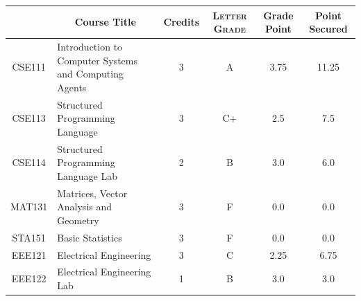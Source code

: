 \documentclass[11pt]{article}
\newcommand*{\numtwo}[1]{\pgfmathprintnumber[
                    fixed, precision=2, fixed zerofill=true]{#1}}
\begin{document}
                \begin{center}
                    \renewcommand{\arraystretch}{1.08}
                    
                \begin{tabular}{|c|l|c|>{\scshape}c|c|c|}
                \hline  \rule[-1ex]{0pt}{3.5ex} {\centering{\bf Course Code}} &  \multicolumn{1}{c|}{\textbf{Course Title}}  & {\bf Credits} & {\bf Letter Grade} & {\bf Grade Point} & {\bf Point Secured}  \\ 
                \hline   CSE111 &  Introduction to Computer Systems and Computing Agents		 & 3 & A & 3.75 & 11.25 \\ %
                \hline   CSE113 &  Structured Programming Language		 & 3 & C+ & 2.5 & 7.5 \\ %
                \hline   CSE114 &  Structured Programming Language Lab		 & 2 & B & 3.0 & 6.0 \\ %
                \hline   MAT131 &  Matrices, Vector Analysis and Geometry		 & 3 & F & 0.0 & 0.0 \\ %
                \hline   STA151 &  Basic Statistics		 & 3 & F & 0.0 & 0.0 \\ %
                \hline   EEE121 &  Electrical Engineering		 & 3 & C & 2.25 & 6.75 \\ %
                \hline   EEE122 &  Electrical Engineering Lab		 & 1 & B & 3.0 & 3.0 \\ %

\hline                %
                \end{tabular}
                \end{center}
                \renewcommand{\arraystretch}{1.03}
\end{document}
